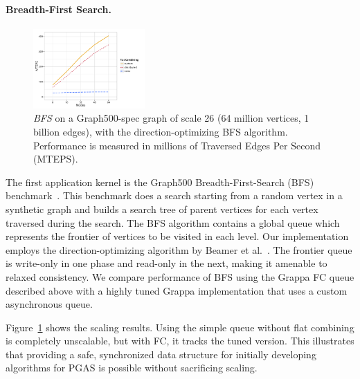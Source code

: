 \paragraph{Breadth-First Search.}
\begin{figure}[t]
  \centering
  \includegraphics[width=0.38\textwidth]{data/plots/bfs_perf.pdf}
  \caption{\emph{BFS} on a Graph500-spec graph of scale 26 (64 million vertices, 1 billion edges), with the direction-optimizing BFS algorithm. Performance is measured in millions of Traversed Edges Per Second (MTEPS).}
  \label{fig:bfs_perf}
\end{figure}
The first application kernel is the Graph500 Breadth-First-Search (BFS) benchmark~\cite{graph500list}. This benchmark does a search starting from a random vertex in a synthetic graph and builds a search tree of parent vertices for each vertex traversed during the search.
The BFS algorithm contains a global queue which represents the frontier of vertices to be visited in each level.
Our implementation employs the direction-optimizing algorithm by Beamer et al.~\cite{Beamer:Graph500}.
The frontier queue is write-only in one phase and read-only in the next, making it amenable to relaxed consistency.
We compare performance of BFS using the Grappa FC queue described above with a highly tuned Grappa implementation that uses a custom asynchronous queue.

Figure~\ref{fig:bfs_perf} shows the scaling results. Using the simple queue without flat combining is completely unscalable, but with FC, it tracks the tuned version. This illustrates that providing a safe, synchronized data structure for initially developing algorithms for PGAS is possible without sacrificing scaling.

